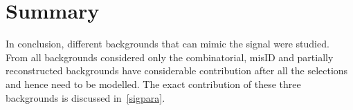 \section{Summary}
In conclusion, different backgrounds that can mimic the signal were studied. From all backgrounds considered only the combinatorial, misID and partially reconstructed backgrounds have considerable contribution after all the selections and hence need to be modelled. The exact contribution of these three backgrounds is discussed in~\autoref{sigpara}.


